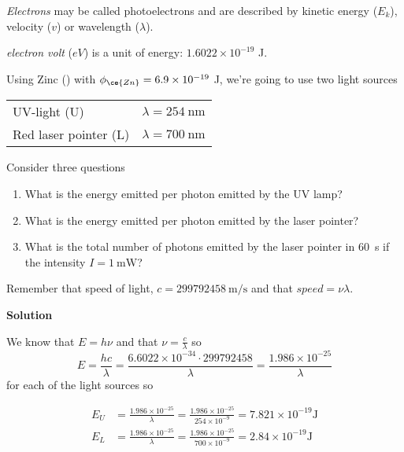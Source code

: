 \documentclass[../mit-general-chemistry.tex]{subfiles}
\begin{document}
{\em Electrons} may be called photoelectrons and are described by
kinetic energy ($E_k$), velocity ($v$) or wavelength ($\lambda$).

{\em electron volt} ($eV$) is a unit of energy: $1.6022\times
10^{-19}$ \si{\joule}.


\begin{example}
  Using Zinc () with $\phi_{\ce{Zn}} = 6.9 \times 10^{-19}$
  \si{\joule}, we're going to use two light sources

  \begin{center}
    \begin{tabular}{ll}
      UV-light (U) & $\lambda = \SI{254}{\nano\meter}$ \\
      Red laser pointer (L) & $\lambda = \SI{700}{\nano\meter}$ \\
    \end{tabular}
  \end{center}

  Consider three questions

  \begin{enumerate}
  \item What is the energy emitted per photon emitted by the UV lamp?
  \item What is the energy emitted per photon emitted by the laser
    pointer?
  \item What is the total number of photons emitted by the laser
    pointer in \SI{60}{\second} if the intensity $I =
    \SI{1}{\milli\watt}$?
  \end{enumerate}

  Remember that speed of light, $c =
  \SI{299792458}{\meter\per\second}$ and that $speed = \nu\lambda$.

  \textbf{Solution}

  We know that $E = h\nu$ and that $\nu = \frac{c}{\lambda}$ so
  \begin{equation}
    E = \frac{hc}{\lambda} = \frac{6.6022\times 10^{-34} \cdot
      299792458}{\lambda} = \frac{1.986\times 10^{-25}}{\lambda}
  \end{equation}
  for each of the light sources so

  \begin{align*}
    E_U &= \frac{1.986\times 10^{-25}}{\lambda} =
    \frac{1.986\times 10^{-25}}{254\times 10^{-9}} =
    7.821\times 10^{-19} \si{\joule} \\
    E_L &= \frac{1.986\times 10^{-25}}{\lambda} =
    \frac{1.986\times 10^{-25}}{700\times 10^{-9}} =
    2.84\times 10^{-19} \si{\joule} \\
  \end{align*}


\end{example}
\end{document}
